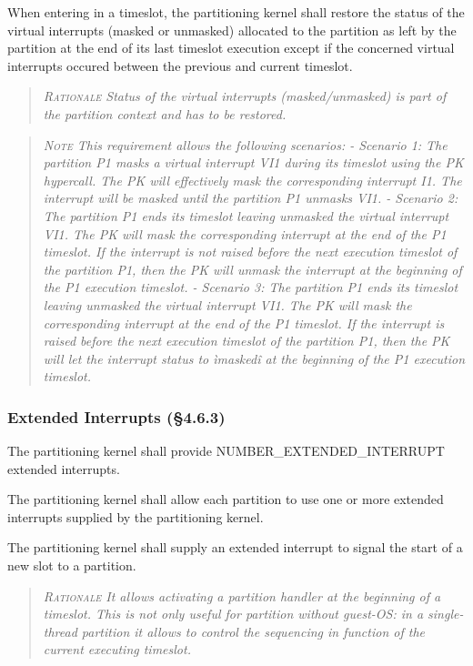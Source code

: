 When entering in a timeslot, the partitioning kernel shall restore the status of the virtual interrupts (masked or unmasked) allocated to the partition as left by the partition at the end of its last timeslot execution except  if the concerned virtual interrupts occured between the previous and current timeslot.
\begin{quote}\it
\textsc{Rationale}
Status of the virtual interrupts (masked/unmasked) is part of the partition context and has to be restored.
\end{quote}
\begin{quote}\it
\textsc{Note}
This requirement allows the following scenarios:
- Scenario 1: The partition P1 masks a virtual interrupt VI1 during its timeslot using the PK hypercall. The PK will effectively mask the corresponding interrupt I1. The interrupt will be masked until the partition P1 unmasks VI1.
- Scenario 2: The partition P1 ends its timeslot leaving unmasked the virtual interrupt VI1. The PK will mask the corresponding interrupt at the end of the P1 timeslot. If the interrupt is not raised before the next execution timeslot of the partition P1, then the PK will unmask the interrupt at the beginning of the P1 execution timeslot.
- Scenario 3: The partition P1 ends its timeslot leaving unmasked the virtual interrupt VI1. The PK will mask the corresponding interrupt at the end of the P1 timeslot. If the interrupt is raised before the next execution timeslot of the partition P1, then the PK will let the interrupt status to ìmaskedî at the beginning of the P1 execution timeslot.
\end{quote}

\subsubsection{Extended Interrupts (\S4.6.3)}

The partitioning kernel shall provide NUMBER\_EXTENDED\_INTERRUPT extended interrupts.

The partitioning kernel shall allow each partition to use one or more extended interrupts supplied by the partitioning kernel.

The partitioning kernel shall supply an extended interrupt to signal the start of a new slot to a partition.
\begin{quote}\it
\textsc{Rationale}
It allows activating a partition handler at the beginning of a timeslot. This is not only useful for partition without guest-OS: in a single-thread partition it allows to control the sequencing in function of the current executing timeslot.
\end{quote}

